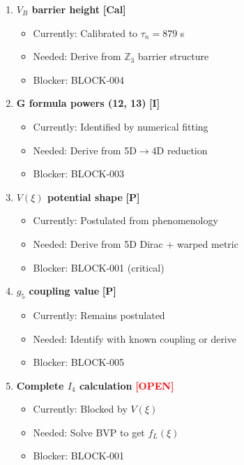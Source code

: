 \documentclass[11pt,a4paper]{article}
\newcommand{\tagP}{\textcolor{red!70!black}{\textbf{[P]}}}
\newcommand{\tagI}{\textcolor{orange!80!black}{\textbf{[I]}}}
\newcommand{\tagCal}{\textcolor{purple!70!black}{\textbf{[Cal]}}}
\newcommand{\tagOPEN}{\textcolor{red}{\textbf{[OPEN]}}}
\begin{document}
\begin{enumerate}
    \item \textbf{$V_B$ barrier height} \tagCal{}
    \begin{itemize}[nosep]
        \item Currently: Calibrated to $\tau_n = 879$ s
        \item Needed: Derive from $\mathbb{Z}_3$ barrier structure
        \item Blocker: BLOCK-004
    \end{itemize}

    \item \textbf{G formula powers (12, 13)} \tagI{}
    \begin{itemize}[nosep]
        \item Currently: Identified by numerical fitting
        \item Needed: Derive from 5D$\to$4D reduction
        \item Blocker: BLOCK-003
    \end{itemize}

    \item \textbf{$V(\xi)$ potential shape} \tagP{}
    \begin{itemize}[nosep]
        \item Currently: Postulated from phenomenology
        \item Needed: Derive from 5D Dirac + warped metric
        \item Blocker: BLOCK-001 (critical)
    \end{itemize}

    \item \textbf{$g_5$ coupling value} \tagP{}
    \begin{itemize}[nosep]
        \item Currently: Remains postulated
        \item Needed: Identify with known coupling or derive
        \item Blocker: BLOCK-005
    \end{itemize}

    \item \textbf{Complete $I_4$ calculation} \tagOPEN{}
    \begin{itemize}[nosep]
        \item Currently: Blocked by $V(\xi)$
        \item Needed: Solve BVP to get $f_L(\xi)$
        \item Blocker: BLOCK-001
    \end{itemize}
\end{enumerate}
\end{document}
